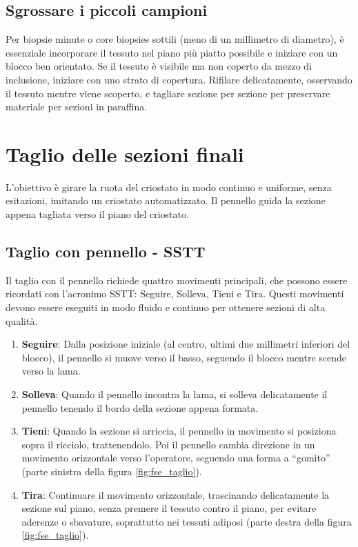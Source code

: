 \subsection{Sgrossare i piccoli campioni}
Per biopsie minute o core biopsies sottili (meno di un millimetro di diametro), è essenziale incorporare il tessuto nel piano più piatto possibile e iniziare con un blocco ben orientato. Se il tessuto è visibile ma non coperto da mezzo di inclusione, iniziare con uno strato di copertura. Rifilare delicatamente, osservando il tessuto mentre viene scoperto, e tagliare sezione per sezione per preservare materiale per sezioni in paraffina. 

\section{Taglio delle sezioni finali}
L'obiettivo è girare la ruota del criostato in modo continuo e uniforme, senza esitazioni, imitando un criostato automatizzato. Il pennello guida la sezione appena tagliata verso il piano del criostato.

\subsection{Taglio con pennello - SSTT}
Il taglio con il pennello richiede quattro movimenti principali, che possono essere ricordati con l'acronimo SSTT: Seguire, Solleva, Tieni e Tira. Questi movimenti devono essere eseguiti in modo fluido e continuo per ottenere sezioni di alta qualità.

\begin{enumerate}
\item \textbf{Seguire}: Dalla posizione iniziale (al centro, ultimi due millimetri inferiori del blocco), il pennello si muove verso il basso, seguendo il blocco mentre scende verso la lama.
\item \textbf{Solleva}: Quando il pennello incontra la lama, si solleva delicatamente il pennello tenendo il bordo della sezione appena formata.
\item \textbf{Tieni}: Quando la sezione si arriccia, il pennello in movimento si posiziona sopra il ricciolo, trattenendolo. Poi il pennello cambia direzione in un movimento orizzontale verso l'operatore, seguendo una forma a “gomito” (parte sinistra della figura \ref{fig:fse_taglio}).
\item \textbf{Tira}: Continuare il movimento orizzontale, trascinando delicatamente la sezione sul piano, senza premere il tessuto contro il piano, per evitare aderenze o sbavature, soprattutto nei tessuti adiposi (parte destra della figura \ref{fig:fse_taglio}).
\end{enumerate}

